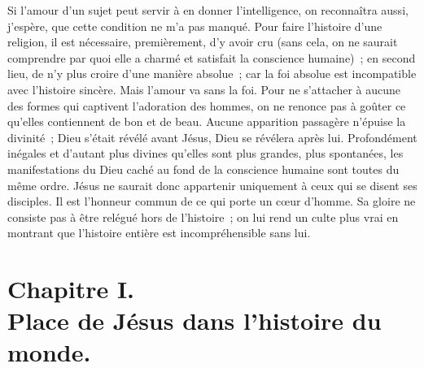 \documentclass[french,twoside]{book} %
\newcommand\chapteropen{} %
\newcommand\chapterclose{} %
\begin{document}
Si l’amour d’un sujet peut servir à en donner l’intelligence, on reconnaîtra aussi, j’espère, que cette condition ne m’a pas manqué. Pour faire l’histoire d’une religion, il est nécessaire, premièrement, d’y avoir cru (sans cela, on ne saurait comprendre par quoi elle a charmé et satisfait la conscience humaine) ; en second lieu, de n’y plus croire d’une manière absolue ; car la foi absolue est incompatible avec l’histoire sincère. Mais l’amour va sans la foi. Pour ne s’attacher à aucune des formes qui captivent l’adoration des hommes, on ne renonce pas à goûter ce qu’elles contiennent de bon et de beau. Aucune apparition passagère n’épuise la divinité ; Dieu s’était révélé avant Jésus, Dieu se révélera après lui. Profondément inégales et d’autant plus divines qu’elles sont plus grandes, plus spontanées, les manifestations du Dieu caché au fond de la conscience humaine sont toutes du même ordre. Jésus ne saurait donc appartenir uniquement à ceux qui se disent ses disciples. Il est l’honneur commun de ce qui porte un cœur d’homme. Sa gloire ne consiste pas à être relégué hors de l’histoire ; on lui rend un culte plus vrai en montrant que l’histoire entière est incompréhensible sans lui.
\chapterclose


\chapteropen
\chapter[{Chapitre I. Place de Jésus dans l’histoire du monde.}]{Chapitre I. \\
Place de Jésus dans l’histoire du monde.}\renewcommand{\leftmark}{Chapitre I. \\
Place de Jésus dans l’histoire du monde.}
\end{document}
